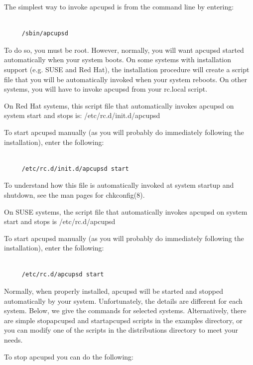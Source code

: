 \label{index-Checking-running-62}
The simplest way to invoke apcupsd is from the command line by entering: 

\footnotesize
\begin{verbatim}
     
     /sbin/apcupsd
\end{verbatim}
\normalsize

To do so, you must be root. However, normally, you will want apcupsd started
automatically when your system boots. On some systems with installation
support (e.g. SUSE and Red Hat), the installation procedure will create a
script file that you will be automatically invoked when your system reboots.
On other systems, you will have to invoke apcupsd from your rc.local script.  

On Red Hat systems, this script file that automatically invokes apcupsd on
system start and stops is: /etc/rc.d/init.d/apcupsd  

To start apcupsd manually (as you will probably do immediately following the
installation), enter the following: 

\footnotesize
\begin{verbatim}
     
     /etc/rc.d/init.d/apcupsd start
\end{verbatim}
\normalsize

To understand how this file is automatically invoked at system startup and
shutdown, see the man pages for chkconfig(8).  

On SUSE systems, the script file that automatically invokes apcupsd on system
start and stops is /etc/rc.d/apcupsd  

To start apcupsd manually (as you will probably do immediately following the
installation), enter the following: 

\footnotesize
\begin{verbatim}
     
     /etc/rc.d/apcupsd start
\end{verbatim}
\normalsize

Normally, when properly installed, apcupsd will be started and stopped
automatically by your system. Unfortunately, the details are different for
each system. Below, we give the commands for selected systems. Alternatively,
there are simple stopapcupsd and startapcupsd scripts in the examples
directory, or you can modify one of the scripts in the distributions directory
to meet your needs.  

To stop apcupsd you can do the following:  

